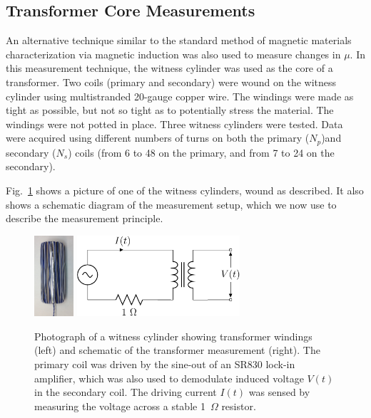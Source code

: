 
\subsection{Transformer Core Measurements}
\label{sec:transformer}

An alternative technique similar to the standard method of magnetic
materials characterization via magnetic induction was also used to
measure changes in $\mu$.  In this measurement technique, the witness
cylinder was used as the core of a transformer.  Two coils (primary
and secondary) were wound on the witness cylinder using multistranded
20-gauge copper wire.  The windings were made as tight as possible,
but not so tight as to potentially stress the material.  The windings
were not potted in place.  Three witness cylinders were tested.  Data
were acquired using different numbers of turns on both the primary
($N_p$)and secondary ($N_s$) coils (from 6 to 48 on the primary, and
from 7 to 24 on the secondary).

Fig.~\ref{fig:transformer} shows a picture of one of the witness
cylinders, wound as described.  It also shows a schematic diagram of
the measurement setup, which we now use to describe the measurement
principle.

\begin{figure}[h!]
  \begin{center}
    \includegraphics[height=3cm]{picture.png}\hskip1cm
    \includegraphics[height=3cm]{figure4-crop.pdf}
    \caption[ Photograh and schematic of the transformer
    measurements]{Photograph of a witness cylinder showing transformer
      windings (left) and schematic of the transformer measurement
      (right).  The primary coil was driven by the sine-out of an
      SR830 lock-in amplifier, which was also used to demodulate
      induced voltage $V(t)$ in the secondary coil. The driving
      current $I(t)$ was sensed by measuring the voltage across a
      stable 1~$\Omega$ resistor.}
    \label{fig:transformer}
  \end{center}
\end{figure}


